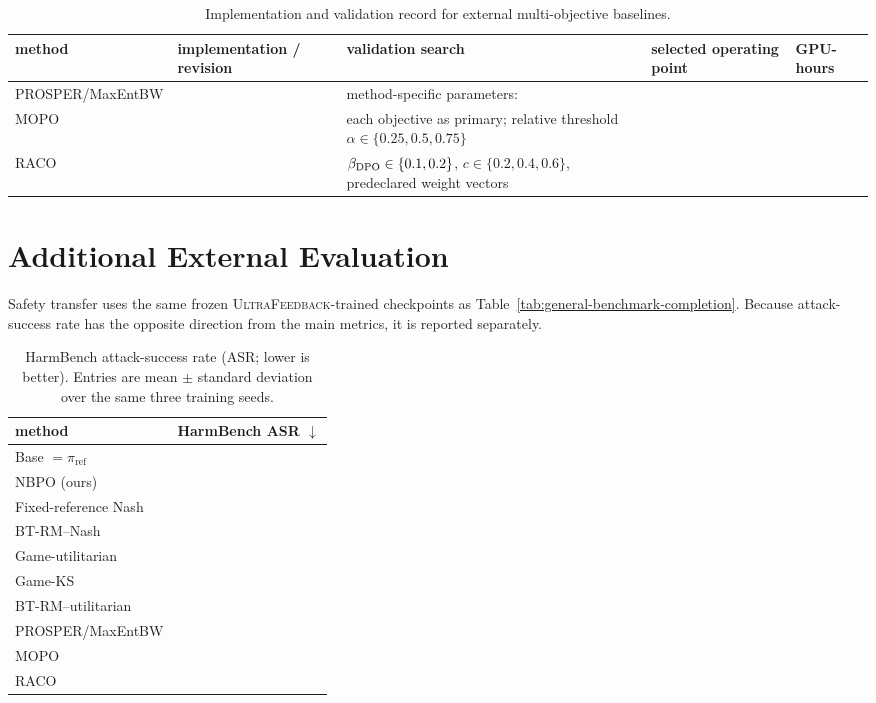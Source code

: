 \documentclass{article}
\theoremstyle{remark}
\theoremstyle{plain}
\newcommand{\piref}{\pi_{\mathrm{ref}}}
\newcommand{\NBPO}{\textsc{NBPO}}
\newcommand{\pending}{\textemdash}
\begin{document}
\begin{table}[t]
\centering\scriptsize
\setlength{\tabcolsep}{2.8pt}
\caption{Implementation and validation record for external multi-objective baselines.}
\label{tab:external-baseline-protocol}
\begin{tabular}{p{2.4cm}p{3.0cm}p{3.3cm}p{3.1cm}p{2.0cm}}
\toprule
method & implementation / revision & validation search & selected operating point & GPU-hours\\
\midrule
PROSPER/MaxEntBW & \pending & method-specific parameters: \pending & \pending & \pending\\
MOPO & \pending & each objective as primary; relative threshold $\alpha\in\{0.25,0.5,0.75\}$ & \pending & \pending\\
RACO & \pending & $\beta_{\rm DPO}\in\{0.1,0.2\}$, $c\in\{0.2,0.4,0.6\}$, predeclared weight vectors & \pending & \pending\\
\bottomrule
\end{tabular}
\end{table}

\section{Additional External Evaluation}
\label{app:external-evaluation}
Safety transfer uses the same frozen \textsc{UltraFeedback}-trained checkpoints as Table~\ref{tab:general-benchmark-completion}. Because attack-success rate has the opposite direction from the main metrics, it is reported separately.

\begin{table}[t]
\centering\footnotesize
\setlength{\tabcolsep}{5.0pt}
\caption{HarmBench attack-success rate (ASR; lower is better). Entries are mean $\pm$ standard deviation over the same three training seeds.}
\label{tab:safety-transfer}
\begin{tabular}{lc}
\toprule
method & HarmBench ASR $\downarrow$\\
\midrule
Base $=\piref$ & \pending\\
\NBPO{} (ours) & \pending\\
Fixed-reference Nash & \pending\\
BT-RM--Nash & \pending\\
Game-utilitarian & \pending\\
Game-KS & \pending\\
BT-RM--utilitarian & \pending\\
PROSPER/MaxEntBW & \pending\\
MOPO & \pending\\
RACO & \pending\\
\bottomrule
\end{tabular}
\end{table}
\end{document}
